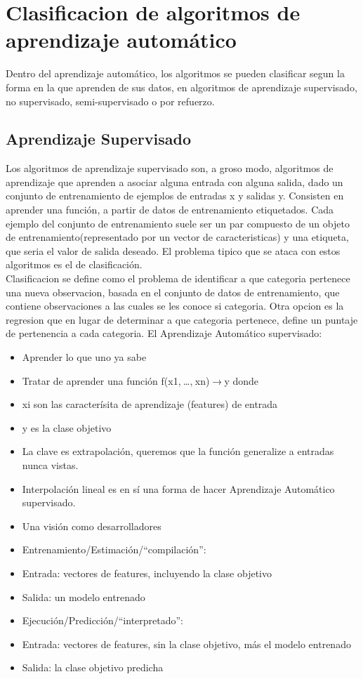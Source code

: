 \documentclass[a4paper,11pt,spanish]{book}
\begin{document}
  \section{Clasificacion de algoritmos de aprendizaje automático}
    Dentro del aprendizaje automático, los algoritmos se pueden clasificar segun la forma en la que aprenden de sus datos, en algoritmos de aprendizaje supervisado, no supervisado, 
    semi-supervisado o por refuerzo.

    \subsection{Aprendizaje Supervisado}
      Los algoritmos de aprendizaje supervisado son, a groso modo, algoritmos de aprendizaje que aprenden a asociar alguna entrada con alguna salida, 
      dado un conjunto de entrenamiento de ejemplos de entradas x y salidas y.
      Consisten en aprender una función, a partir de datos de entrenamiento etiquetados. Cada ejemplo del conjunto de entrenamiento suele ser un par
      compuesto de un objeto de entrenamiento(representado por un vector de caracteristicas) y una etiqueta, que seria el valor de salida deseado.
      El problema tipico que se ataca con estos algoritmos es el de clasificación. \\
      Clasificacion se define como el problema de identificar a que categoria pertenece una nueva observacion,
      basada en el conjunto de datos de entrenamiento, que contiene observaciones a las cuales se les conoce si categoria.
      Otra opcion es la regresion que en lugar de determinar a que categoria pertenece, define un puntaje de pertenencia a cada categoria.
      El Aprendizaje Automático supervisado:
      \begin{itemize}
	\item Aprender lo que uno ya sabe
	\item Tratar de aprender una función f(x1, …, xn) → y donde
	\item xi son las caracterísita de aprendizaje (features) de entrada
	\item y es la clase objetivo
	\item La clave es extrapolación, queremos que la función generalize a entradas nunca vistas.
	\item Interpolación lineal es en sí una forma de hacer Aprendizaje Automático supervisado.
	\item Una visión como desarrolladores
	\item Entrenamiento/Estimación/“compilación”:
	\item Entrada: vectores de features, incluyendo la clase objetivo
	\item Salida: un modelo entrenado
	\item Ejecución/Predicción/“interpretado”:
	\item Entrada: vectores de features, sin la clase objetivo, más el modelo entrenado
	\item Salida: la clase objetivo predicha
      \end{itemize}
      
\end{document}
